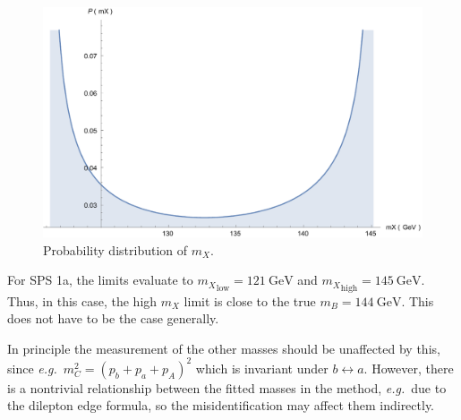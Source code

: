 \documentclass[twoside,english]{uiofysmaster}
\begin{document}
\begin{figure}[hbt]
\centering
\includegraphics[scale=0.4]{figures/appendix/mX-distribution.pdf}
\caption{Probability distribution of $m_X$.}
\label{fig:mX-dist_improvementchap}
\end{figure}
For SPS 1a, the limits evaluate to ${m_X}_\mathrm{low} = 121~\mathrm{GeV}$ and ${m_X}_\mathrm{high} = 145 ~\mathrm{GeV}$. Thus, in this case, the high $m_X$ limit is close to the true $m_B = 144 ~\mathrm{GeV}$. This does not have to be the case generally. 

In principle the measurement of the other masses should be unaffected by this, since {\it e.g.}\ $m_C^2 = (p_b + p_a + p_A)^2$ which is invariant under $b\leftrightarrow a$. However, there is a nontrivial relationship between the fitted masses in the method, {\it e.g.}\ due to the dilepton edge formula, so the misidentification may affect them indirectly.
\end{document}
